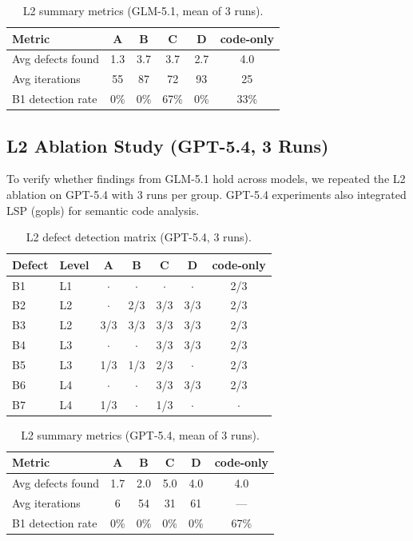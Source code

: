 \documentclass[sigconf,nonacm]{acmart}
\begin{document}
\begin{table}[t]
\caption{L2 summary metrics (GLM-5.1, mean of 3 runs).}
\label{tab:glm-summary}
\small
\begin{tabular}{lccccc}
\toprule
Metric & A & B & C & D & code-only \\
\midrule
Avg defects found & 1.3 & 3.7 & 3.7 & 2.7 & 4.0 \\
Avg iterations & 55 & 87 & 72 & 93 & 25 \\
B1 detection rate & 0\% & 0\% & 67\% & 0\% & 33\% \\
\bottomrule
\end{tabular}
\end{table}


\subsection{L2 Ablation Study (GPT-5.4, 3 Runs)}

To verify whether findings from GLM-5.1 hold across models, we repeated the L2 ablation on GPT-5.4 with 3 runs per group. GPT-5.4 experiments also integrated LSP (gopls) for semantic code analysis.

\begin{table}[t]
\caption{L2 defect detection matrix (GPT-5.4, 3 runs).}
\label{tab:gpt-matrix}
\small
\begin{tabular}{llccccc}
\toprule
Defect & Level & A & B & C & D & code-only \\
\midrule
B1 & L1 & $\cdot$ & $\cdot$ & $\cdot$ & $\cdot$ & 2/3 \\
B2 & L2 & $\cdot$ & 2/3 & 3/3 & 3/3 & 2/3 \\
B3 & L2 & 3/3 & 3/3 & 3/3 & 3/3 & 2/3 \\
B4 & L3 & $\cdot$ & $\cdot$ & 3/3 & 3/3 & 2/3 \\
B5 & L3 & 1/3 & 1/3 & 2/3 & $\cdot$ & 2/3 \\
B6 & L4 & $\cdot$ & $\cdot$ & 3/3 & 3/3 & 2/3 \\
B7 & L4 & 1/3 & $\cdot$ & 1/3 & $\cdot$ & $\cdot$ \\
\bottomrule
\end{tabular}
\end{table}

\begin{table}[t]
\caption{L2 summary metrics (GPT-5.4, mean of 3 runs).}
\label{tab:gpt-summary}
\small
\begin{tabular}{lccccc}
\toprule
Metric & A & B & C & D & code-only \\
\midrule
Avg defects found & 1.7 & 2.0 & 5.0 & 4.0 & 4.0 \\
Avg iterations & 6 & 54 & 31 & 61 & --- \\
B1 detection rate & 0\% & 0\% & 0\% & 0\% & 67\% \\
\bottomrule
\end{tabular}
\end{table}
\end{document}

